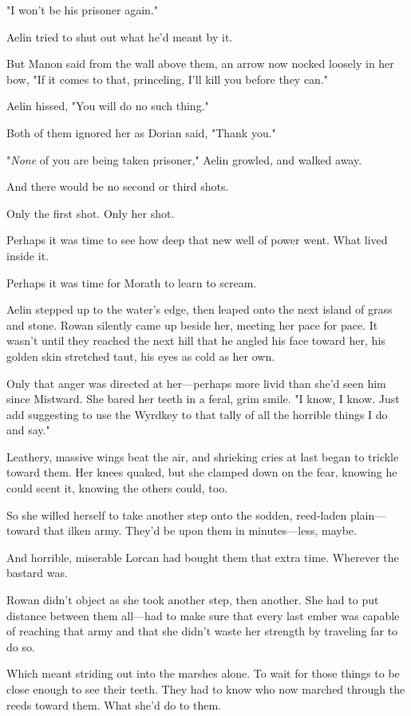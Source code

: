 "I won't be his prisoner again."

Aelin tried to shut out what he'd meant by it.

But Manon said from the wall above them, an arrow now nocked loosely in her bow, "If it comes to that, princeling, I'll kill you before they can."

Aelin hissed, "You will do no such thing."

Both of them ignored her as Dorian said, "Thank you."

"\emph{None} of you are being taken prisoner," Aelin growled, and walked away.

And there would be no second or third shots.

Only the first shot.
Only her shot.

Perhaps it was time to see how deep that new well of power went.
What lived inside it.

Perhaps it was time for Morath to learn to scream.

Aelin stepped up to the water's edge, then leaped onto the next island of grass and stone.
Rowan silently came up beside her, meeting her pace for pace.
It wasn't until they reached the next hill that he angled his face toward her, his golden skin stretched taut, his eyes as cold as her own.

Only that anger was directed at her---perhaps more livid than she'd seen him since Mistward.
She bared her teeth in a feral, grim smile.
"I know, I know.
Just add suggesting to use the Wyrdkey to that tally of all the horrible things I do and say."

Leathery, massive wings beat the air, and shrieking cries at last began to trickle toward them.
Her knees quaked, but she clamped down on the fear, knowing he could scent it, knowing the others could, too.

So she willed herself to take another step onto the sodden, reed-laden plain--- toward that ilken army.
They'd be upon them in minutes---less, maybe.

And horrible, miserable Lorcan had bought them that extra time.
Wherever the bastard was.

Rowan didn't object as she took another step, then another.
She had to put distance between them all---had to make sure that every last ember was capable of reaching that army and that she didn't waste her strength by traveling far to do so.

Which meant striding out into the marshes alone.
To wait for those things to be close enough to see their teeth.
They had to know who now marched through the reeds toward them.
What she'd do to them.

